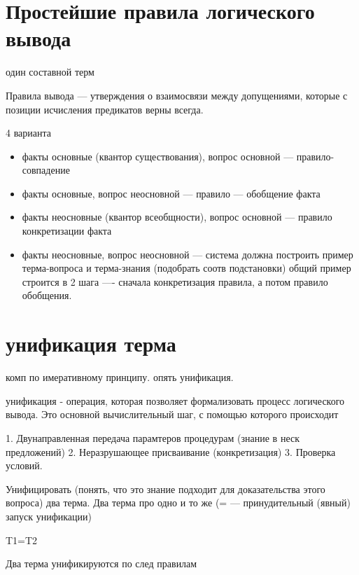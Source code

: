 \section{Простейшие правила логического вывода}

один составной терм

Правила вывода — утверждения о взаимосвязи между допущениями, которые с позиции исчисления предикатов верны всегда.

4 варианта
\begin{itemize}
    \item факты основные (квантор существования), вопрос основной — правило-совпадение
    \item факты основные, вопрос неосновной — правило — обобщение факта
    \item факты неосновные (квантор всеобщности), вопрос основной — правило конкретизации факта
    \item факты неосновные, вопрос неосновной — система должна построить пример терма-вопроса и терма-знания (подобрать
соотв подстановки) общий пример строится в 2 шага —- сначала конкретизация правила, а потом правило обобщения.
\end{itemize}

\section*{унификация терма}

комп по имеративному принципу. опять унификация.

унификация - операция, которая позволяет формализовать процесс логического вывода. Это основной вычислительный шаг, с помощью которого происходит

1. Двунаправленная передача парамтеров процедурам (знание в неск предложений)
2. Неразрушающее присваивание (конкретизация)
3. Проверка условий.


Унифицировать (понять, что это знание подходит для доказательства этого вопроса) два терма. Два терма про одно и то же (= — принудительный (явный) запуск унификации)

T1=T2


Два терма унификируются по след правилам

